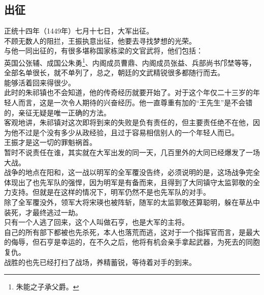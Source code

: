 \begin{multicols}{\theparacolNo}
\subsection{出征}
正统十四年（1449年）七月十七日，大军出征。\\

不顾无数人的阻拦，王振执意出征，他要去寻找梦想的光荣。\\

与他一同出征的，有很多堪称国家栋梁的文官武将，他们包括：\\

英国公张辅、成国公朱勇\footnote{朱能之子承父爵。}、内阁成员曹鼎、内阁成员张益、兵部尚书邝埜等等，全部名单很长，就不单列了，总之，朝廷的文武精锐很多都随行而去。\\

能够活着回来得很少。\\

此时的朱祁镇也不会知道，他的传奇经历就要开始了。对于这个年仅二十三岁的年轻人而言，这是一次令人期待的兴奋经历。他一直尊重有加的“王先生”是不会错的，亲征无疑是唯一正确的方法。\\

客观地讲，朱祁镇对这次即将到来的失败是负有责任的，但主要责任绝不在他，因为他不过是个没有多少从政经验，且过于容易相信别人的一个年轻人而已。\\

王振才是这一切的罪魁祸首。\\

暂时不说责任在谁，其实就在大军出发的同一天，几百里外的大同已经爆发了一场大战。\\

战争的地点在阳和，这一战以明军的全军覆没告终，必须说明的是，这场战争完全体现出了也先军队的强悍，因为明军是有备而来，且得到了大同镇守太监郭敬的全力支持。但就是在这样的情况下，明军仍然不是也先军队的对手。\\

除了全军覆没外，领军大将宋瑛也被阵斩，随军的太监郭敬还算聪明，躲在草丛中装死，才最终逃过一劫。\\

只有一个人逃了回来，这个人叫做石亨，也是大军的主将。\\

自己的所有部下都被也先杀死，本人也落荒而逃，这对于一个指挥官而言，是最大的侮辱，但石亨是幸运的，在不久之后，他将有机会亲手拿起武器，为死去的同胞复仇。\\

战胜的也先已经打扫了战场，养精蓄锐，等待着对手的到来。\\


\end{multicols}

